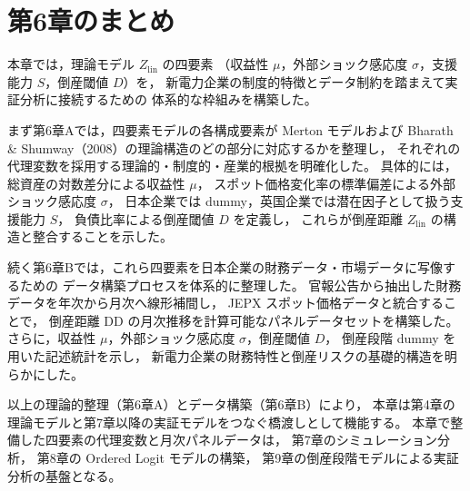 
\section{第6章のまとめ}

本章では，理論モデル $Z_{\text{lin}}$ の四要素
（収益性 $\mu$，外部ショック感応度 $\sigma$，支援能力 $S$，倒産閾値 $D$）を，
新電力企業の制度的特徴とデータ制約を踏まえて実証分析に接続するための
体系的な枠組みを構築した。

まず第6章Aでは，四要素モデルの各構成要素が
Merton モデルおよび Bharath \& Shumway（2008）の理論構造のどの部分に対応するかを整理し，
それぞれの代理変数を採用する理論的・制度的・産業的根拠を明確化した。
具体的には，総資産の対数差分による収益性 $\mu$，
スポット価格変化率の標準偏差による外部ショック感応度 $\sigma$，
日本企業では dummy，英国企業では潜在因子として扱う支援能力 $S$，
負債比率による倒産閾値 $D$ を定義し，
これらが倒産距離 $Z_{\text{lin}}$ の構造と整合することを示した。

続く第6章Bでは，これら四要素を日本企業の財務データ・市場データに写像するための
データ構築プロセスを体系的に整理した。
官報公告から抽出した財務データを年次から月次へ線形補間し，
JEPX スポット価格データと統合することで，
倒産距離 DD の月次推移を計算可能なパネルデータセットを構築した。
さらに，収益性 $\mu$，外部ショック感応度 $\sigma$，倒産閾値 $D$，
倒産段階 dummy を用いた記述統計を示し，
新電力企業の財務特性と倒産リスクの基礎的構造を明らかにした。

以上の理論的整理（第6章A）とデータ構築（第6章B）により，
本章は第4章の理論モデルと第7章以降の実証モデルをつなぐ橋渡しとして機能する。
本章で整備した四要素の代理変数と月次パネルデータは，
第7章のシミュレーション分析，
第8章の Ordered Logit モデルの構築，
第9章の倒産段階モデルによる実証分析の基盤となる。

